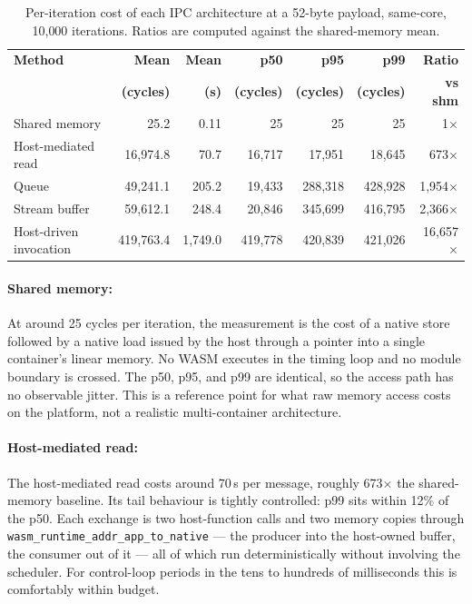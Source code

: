 \documentclass[12pt, a4paper]{report}
\begin{document}
\begin{table}[htbp]
\centering
\small
\begin{tabular}{@{}lrrrrrr@{}}
\toprule
\textbf{Method} & \textbf{Mean} & \textbf{Mean} & \textbf{p50} & \textbf{p95} & \textbf{p99} & \textbf{Ratio} \\
 & \textbf{(cycles)} & \textbf{(\textmu{}s)} & \textbf{(cycles)} & \textbf{(cycles)} & \textbf{(cycles)} & \textbf{vs shm} \\
\midrule
Shared memory   & 25.2       & 0.11   & 25      & 25      & 25      & 1$\times$ \\
Host-mediated read     & 16{,}974.8 & 70.7   & 16{,}717 & 17{,}951 & 18{,}645 & 673$\times$ \\
Queue                  & 49{,}241.1 & 205.2  & 19{,}433 & 288{,}318 & 428{,}928 & 1{,}954$\times$ \\
Stream buffer          & 59{,}612.1 & 248.4  & 20{,}846 & 345{,}699 & 416{,}795 & 2{,}366$\times$ \\
Host-driven invocation & 419{,}763.4 & 1{,}749.0 & 419{,}778 & 420{,}839 & 421{,}026 & 16{,}657$\times$ \\
\bottomrule
\end{tabular}
\caption{Per-iteration cost of each IPC architecture at a 52-byte payload, same-core, 10{,}000 iterations. Ratios are computed against the shared-memory mean.}
\label{tab:ipc-methods-p52}
\end{table}

\paragraph{Shared memory:} At around 25 cycles per iteration, the measurement is the cost of a native store followed by a native load issued by the host through a pointer into a single container's linear memory. No WASM executes in the timing loop and no module boundary is crossed. The p50, p95, and p99 are identical, so the access path has no observable jitter. This is a reference point for what raw memory access costs on the platform, not a realistic multi-container architecture.

\paragraph{Host-mediated read:} The host-mediated read costs around 70\,\textmu{}s per message, roughly 673$\times$ the shared-memory baseline. Its tail behaviour is tightly controlled: p99 sits within 12\% of the p50. Each exchange is two host-function calls and two memory copies through \texttt{wasm\_runtime\_addr\_app\_to\_native} --- the producer into the host-owned buffer, the consumer out of it --- all of which run deterministically without involving the scheduler. For control-loop periods in the tens to hundreds of milliseconds this is comfortably within budget.
\end{document}
